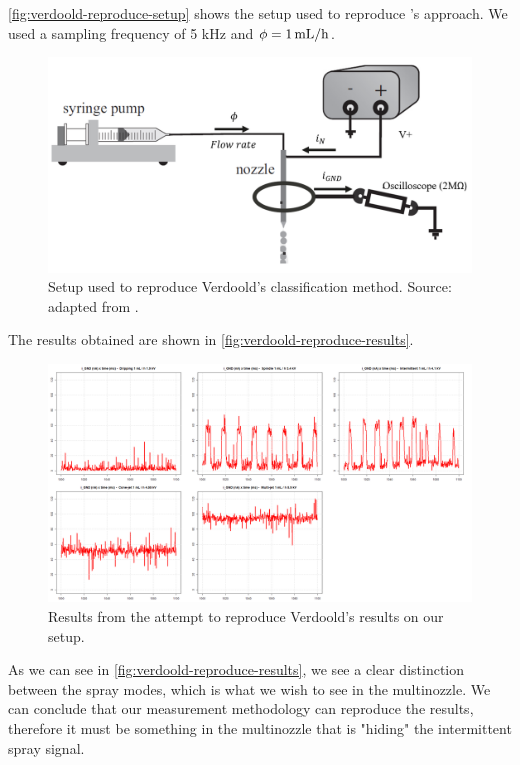 \documentclass[oneside,12pt]{article}
\begin{document}
\autoref{fig:verdoold-reproduce-setup} shows the setup used to reproduce \cite{Verdoold2013}'s approach.
We used a sampling frequency of 5 kHz and $\phi = 1 \,\mathrm{mL/h}$. 

\begin{figure}[h!]
    \centering
    \includegraphics[width=.8\textwidth,trim=1 1 1 1,clip]{figures/verdoold-reproduce-setup.png}
    \caption{Setup used to reproduce Verdoold's classification method. Source: adapted from \cite{Verdoold2013}.}
    \label{fig:verdoold-reproduce-setup}
\end{figure}

The results obtained are shown in \autoref{fig:verdoold-reproduce-results}. 

\begin{figure}[h!]
    \centering
    \includegraphics[width=1\textwidth,trim=1 1 1 1,clip]{figures/verdoold-reproduce-results.png}
    \caption{Results from the attempt to reproduce Verdoold's results on our setup.}
    \label{fig:verdoold-reproduce-results}
\end{figure}

As we can see in \autoref{fig:verdoold-reproduce-results}, we see a clear distinction between the spray modes, 
which is what we wish to see in the multinozzle. We can conclude that our measurement methodology can 
reproduce the results, therefore it must be something in the multinozzle that is "hiding" the intermittent spray 
signal.
\end{document}
